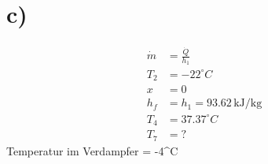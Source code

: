 

\section*{c)}
\begin{align*}
    \dot{m} &= \frac{\dot{Q}}{h_1} \\
    T_2 &= -22^\circ C \\
    x &= 0 \\
    h_f &= h_1 = 93.62 \, \text{kJ/kg} \\
    T_4 &= 37.37^\circ C \\
    T_7 &= ?
\end{align*}
Temperatur im Verdampfer = -4^\circ C